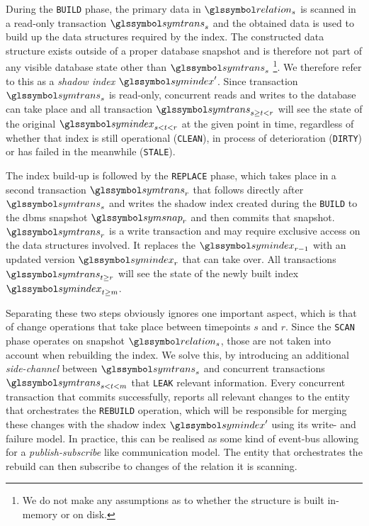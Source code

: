 During the \texttt{BUILD} phase, the primary data in $\relation_{s}$ is scanned in a read-only transaction $\symtrans_{s}$ and the obtained data is used to build up the data structures required by the index. The constructed data structure exists outside of a proper database snapshot and is therefore not part of any visible database state other than $\symtrans_{s}$ \footnote{We do not make any assumptions as to whether the structure is built in-memory or on disk.}. We therefore refer to this as a \emph{shadow index} $\symindex^{\prime}$. Since transaction $\symtrans_{s}$ is read-only, concurrent reads and writes to the database can take place and all transaction $\symtrans_{s \geq t < r}$ will see the state of the original $\symindex_{s < t < r}$ at the given point in time, regardless of whether that index is still operational (\texttt{CLEAN}), in process of deterioration (\texttt{DIRTY}) or has failed in the meanwhile (\texttt{STALE}). 

The index build-up is followed by the \texttt{REPLACE} phase, which takes place in a second transaction $\symtrans_{r}$ that follows directly after $\symtrans_{s}$ and writes the shadow index created during the \texttt{BUILD} to the \acrshort{dbms} snapshot $\symsnap_r$ and then commits that snapshot. $\symtrans_{r}$ is a write transaction and may require exclusive access on the data structures involved. It replaces the $\symindex_{r-1}$ with an updated version $\symindex_{r}$ that can take over. All transactions $\symtrans_{t \geq r}$ will see the state of the newly built index $\symindex_{t \geq m}$. 

Separating these two steps obviously ignores one important aspect, which is that of change operations that take place between timepoints $s$ and $r$. Since the \texttt{SCAN} phase operates on snapshot $\relation_{s}$, those are not taken into account when rebuilding the index. We solve this, by introducing an additional \emph{side-channel} between $\symtrans_{s}$ and concurrent transactions $\symtrans_{s < t < m}$ that \texttt{LEAK} relevant information. Every concurrent transaction that commits successfully, reports all relevant changes to the entity that orchestrates the \texttt{REBUILD} operation, which will be responsible for merging these changes with the shadow index $\symindex^{\prime}$ using its write- and failure model. In practice, this can be realised as some kind of event-bus allowing for a \emph{publish-subscribe} like communication model. The entity that orchestrates the rebuild can then subscribe to changes of the relation it is scanning.

